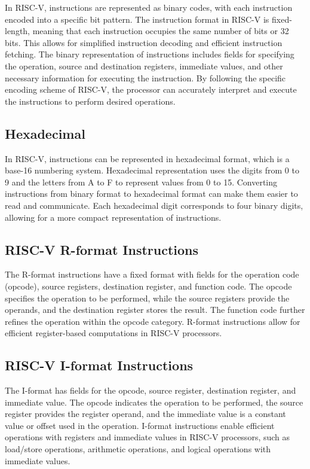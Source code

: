             In RISC-V, instructions are represented as binary codes, with each instruction encoded into a specific bit pattern. The instruction format in RISC-V is fixed-length, meaning that each instruction occupies the same number of bits or 32 bits. This allows for simplified instruction decoding and efficient instruction fetching. The binary representation of instructions includes fields for specifying the operation, source and destination registers, immediate values, and other necessary information for executing the instruction. By following the specific encoding scheme of RISC-V, the processor can accurately interpret and execute the instructions to perform desired operations.        
        
        \subsection{Hexadecimal}

            In RISC-V, instructions can be represented in hexadecimal format, which is a base-16 numbering system. Hexadecimal representation uses the digits from 0 to 9 and the letters from A to F to represent values from 0 to 15. Converting instructions from binary format to hexadecimal format can make them easier to read and communicate. Each hexadecimal digit corresponds to four binary digits, allowing for a more compact representation of instructions. 
        
        \subsection{RISC-V R-format Instructions}

             The R-format instructions have a fixed format with fields for the operation code (opcode), source registers, destination register, and function code. The opcode specifies the operation to be performed, while the source registers provide the operands, and the destination register stores the result. The function code further refines the operation within the opcode category. R-format instructions allow for efficient register-based computations in RISC-V processors.
        
        \subsection{RISC-V I-format Instructions}

            The I-format has fields for the opcode, source register, destination register, and immediate value. The opcode indicates the operation to be performed, the source register provides the register operand, and the immediate value is a constant value or offset used in the operation. I-format instructions enable efficient operations with registers and immediate values in RISC-V processors, such as load/store operations, arithmetic operations, and logical operations with immediate values.
        
